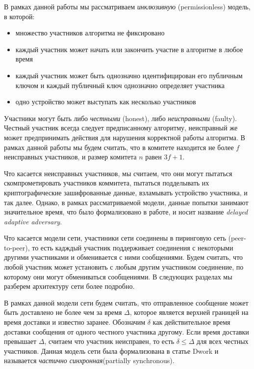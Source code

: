 В рамках данной работы мы рассматриваем \textit{инклюзивную} (permissionless) модель, в которой:
\begin{itemize}
\item множество участников алгоритма не фиксировано
\item каждый участник может начать или закончить участие в алгоритме в любое время
\item каждый участник может быть однозначно идентифицирован его публичным ключом и каждый публичный ключ однозначно определяет участника
\item одно устройство может выступать как несколько участников
\end{itemize}

Участники могут быть либо \textit{честными} (honest), либо \textit{неисправными} (faulty).  Честный участник всегда следует предписанному алгоритму, неисправный же может предпринимать действия для нарушения корректной работы алгоритма.
В рамках данной работы мы будем считать, что в комитете находится не более $f$ неисправных участников, и размер комитета $n$ равен $3f+1$.

Что касается неисправных участников, мы считаем, что они могут пытаться скомпрометировать участников коммитета, пытаться подделывать их криптографические зашифрованные данные, взламывать устройство участника, и так далее. Однако, в рамках рассматриваемой модели, данные попытки занимают значительное время, что было формализовано в работе\cite{hybrid-consensus}, и носит название \textit{delayed adaptive adversary}.

Что касается модели сети, участиники сети соединены в пиринговую сеть (peer-to-peer), 
то есть кадждый участник поддерживает соединения с некоторыми другими участниками и обменивается с ними сообщениями. Будем считать, что любой участник может установить с любым другим участником соединение, по которому они могут обмениваться сообщениями. В следующих разделах мы разберем архитектуру сети более подробно.

В рамках данной модели сети будем считать, что отправленное сообщение может быть доставлено не более чем за время $\Delta$, которое является верхней границей на время доставки и известно заранее.
Обозначим $\delta$ как действительное время доставки сообщения от одного честного участника другому. 
Если время доставки превышает $\Delta$, считаем что участник неисправен, 
то есть $\delta \le \Delta$ для всех честных участников. 
Данная модель сети была формализована в статье Dwork \cite{Dwork:1988:CPP:42282.42283} и называется \textit{частично синхронная}(partially synchronous).

